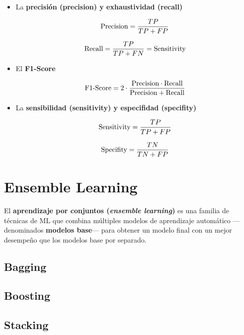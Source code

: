 \begin{itemize}
    \item La \textbf{precisión (precision) y exhaustividad (recall)} 
    
    $$
    \textnormal{Precision} = \frac{TP}{TP+FP}
    $$

    $$
    \textnormal{Recall} = \frac{TP}{TP+FN} = \textnormal{Sensitivity}
    $$
    

    \item El \textbf{F1-Score} 

    $$
    \textnormal{F1-Score} = 2 \cdot \frac{\textnormal{Precision} \cdot \textnormal{Recall}}{\textnormal{Precision} + \textnormal{Recall}}
    $$


    \item La \textbf{sensibilidad (sensitivity) y especifidad (specifity)}

    $$
    \textnormal{Sensitivity} = \frac{TP}{TP+FP}
    $$

    $$
    \textnormal{Specifity} = \frac{TN}{TN+FP}
    $$


\end{itemize}



\section{Ensemble Learning}

El \textbf{aprendizaje por conjuntos (\textit{ensemble learning})} es una familia de técnicas de ML que combina
múltiples modelos de aprendizaje automático ---denominados \textbf{modelos base}--- para obtener un modelo final
con un mejor desempeño que los modelos base por separado.

\subsection{Bagging}


\subsection{Boosting}


\subsection{Stacking}


